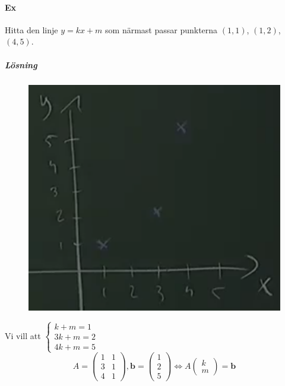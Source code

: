 \paragraph{Ex} Hitta den linje $y=kx+m$ som närmast passar punkterna $(1,1)$, $(1,2)$, $(4,5)$.
\subparagraph{Lösning}
\begin{figure}
    \vspace{-25pt}
    \centering
    \includegraphics[scale=0.42]{imgs/img02.png}
    \vspace{-50pt}
\end{figure}
Vi vill att $\begin{cases}k+m=1\\3k+m=2\\4k+m=5\end{cases}$
\begin{equation*}
    A=\begin{pmatrix}
        1&1\\
        3&1\\
        4&1
    \end{pmatrix},
    \bm{b}=\begin{pmatrix}
        1\\2\\5
    \end{pmatrix}
    \Leftrightarrow
    A\begin{pmatrix}
        k\\m
    \end{pmatrix}=\bm{b}
\end{equation*}
